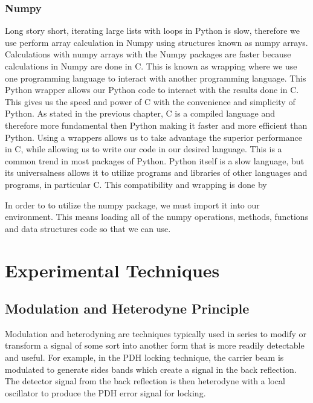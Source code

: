\documentclass[11pt,a4paper]{book}
\begin{document}
		\subsection{Numpy}
			\label{subsec:Numpy}
			Long story short, iterating large lists with loops in Python is slow, therefore we use perform array calculation in Numpy using structures known as numpy arrays. Calculations with numpy arrays with the Numpy packages are faster because calculations in Numpy are done in C. This is known as wrapping where we use one programming language to interact with another programming language. This Python wrapper allows our Python code to interact with the results done in C. This gives us the speed and power of C with the convenience and simplicity of Python. As stated in the previous chapter, C is a compiled language and therefore more fundamental then Python making it faster and more efficient than Python. Using a wrappers allows us to take advantage the superior performance in C, while allowing us to write our code in our desired language. This is a common trend in most packages of Python. Python itself is a slow language, but its universalness allows it to utilize programs and libraries of other languages and programs, in particular C. This compatibility and wrapping is done by 
			
			In order to to utilize the numpy package, we must import it into our environment. This means loading all of the numpy operations, methods, functions and data structures code so that we can use.
		

\chapter{Experimental Techniques}
	\label{chp: Experimental Techniques}
	\section{Modulation and Heterodyne Principle}
		\label{sec:Modulation and Heterodyne Principle}
		Modulation and heterodyning are techniques typically used in series to modify or transform a signal of some sort into another form that is more readily detectable and useful. For example, in the PDH locking technique, the carrier beam is modulated to generate sides bands which create a signal in the back reflection. The detector signal from the back reflection is then heterodyne with a local oscillator to produce the PDH error signal for locking.
\end{document}
